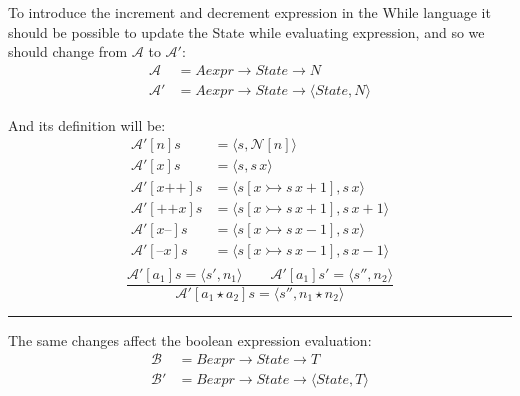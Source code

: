 \documentclass{article}
\begin{document}
To introduce the increment and decrement expression in the While language it should be possible to update the State while evaluating expression,
and so we should change from $\mathcal{A}$ to $\mathcal{A}'$:
$$ 
    \begin{aligned}
        \mathcal{A} &= Aexpr \rightarrow State \rightarrow N \\
        \mathcal{A}'&= Aexpr \rightarrow State \rightarrow \langle State, N\rangle
    \end{aligned}
$$

And its definition will be:
$$ 
    \begin{aligned}
        \mathcal{A}'[n]s &= \langle s, \mathcal{N}[n]\rangle \\
        \mathcal{A}'[x]s &= \langle s, s\,x \rangle \\
        \mathcal{A}'[x\texttt{++}]s &= \langle s[x\rightarrowtail s\, x +1 ], s\,x \rangle \\
        \mathcal{A}'[\texttt{++}x]s &= \langle s[x\rightarrowtail s\, x +1 ], s\,x +1 \rangle \\
        \mathcal{A}'[x\texttt{--}]s &= \langle s[x\rightarrowtail s\, x -1 ], s\,x \rangle \\
        \mathcal{A}'[\texttt{--}x]s &= \langle s[x\rightarrowtail s\, x -1 ], s\,x -1\rangle \\
    \end{aligned}
$$
$$
\frac
    {\mathcal{A}'[a_1]s = \langle s', n_1\rangle \quad\quad \mathcal{A}'[a_1]s' = \langle s'', n_2\rangle}
    {\mathcal{A}'[a_1 \star a_2]s = \langle s'', n_1 \star n_2\rangle}
$$

\vspace{1em}
\hrule
\vspace{2em}

The same changes affect the boolean expression evaluation:
$$ 
    \begin{aligned}
        \mathcal{B} &= Bexpr \rightarrow State \rightarrow T \\
        \mathcal{B}'&= Bexpr \rightarrow State \rightarrow \langle State, T\rangle
    \end{aligned}
$$
\end{document}
